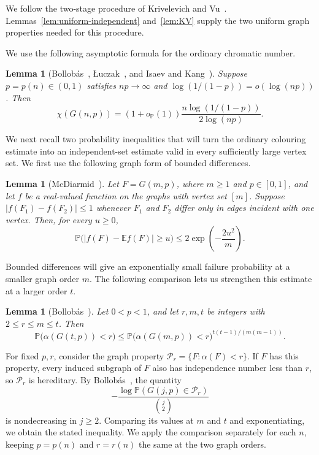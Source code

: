 \documentclass[11pt]{article}
\newtheorem{lemma}[theorem]{Lemma}
\numberwithin{equation}{section}
\newcommand{\Prob}{\mathbb P}
\newcommand{\E}{\mathbb E}
\newcommand{\op}{o_{\mathbb P}}
\begin{document}
We follow the two-stage procedure of Krivelevich and Vu~\cite[proof of Theorem~3]{KV}. Lemmas~\ref{lem:uniform-independent} and~\ref{lem:KV} supply the two uniform graph properties needed for this procedure.

We use the following asymptotic formula for the ordinary chromatic number.


\begin{lemma}[{Bollob\'as~\cite{Bollobas1988},
\L uczak~\cite{Luczak1991}, and
Isaev and Kang~\cite{IK}}]\label{lem:ordinary}
Suppose $p=p(n)\in(0,1)$ satisfies $np\to\infty$ and
$\log(1/(1-p))=o(\log(np))$. Then
\begin{equation}\label{eq:ordinary}
 \chi(G(n,p))=(1+\op(1))
 \frac{n\log(1/(1-p))}{2\log(np)}.
\end{equation}
\end{lemma}
{We next recall two probability inequalities that will turn the ordinary colouring estimate into an independent-set estimate valid in every sufficiently large vertex set. We first use the following graph form of bounded differences.}

  
\begin{lemma}[McDiarmid~{\cite[Lemma~(3.2)]{McDiarmid1989}}]\label{lem:bounded-differences}
Let $F=G(m,p)$, where $m\ge1$ and $p\in[0,1]$, and let $f$ be a real-valued function on the graphs with vertex set $[m]$. Suppose $|f(F_1)-f(F_2)|\le1$ whenever $F_1$ and $F_2$ differ only in edges incident with one vertex. Then, for every $u\ge0$,
\[
 \Prob\bigl(|f(F)-\E f(F)|\ge u\bigr)
 \le2\exp\left(-\frac{2u^2}{m}\right).
\]
\end{lemma}
 

  {Bounded differences will give an exponentially small failure probability at a smaller graph order $m$. The following comparison lets us strengthen this estimate at a larger order $t$.}

  
\begin{lemma}[Bollob\'as~{\cite[Theorem~5]{BollobasICM1998}}]
\label{lem:hereditary-comparison}
Let $0<p<1$, and let $r,m,t$ be integers with $2\le r\le m\le t$. Then
\[
 \Prob\bigl(\alpha(G(t,p))<r\bigr)
 \le
 \Prob\bigl(\alpha(G(m,p))<r\bigr)^{t(t-1)/(m(m-1))}.
\]
\end{lemma}
 

  
For fixed $p,r$, consider the graph property $\mathcal P_r=\{F:\alpha(F)<r\}$. If $F$ has this property, every induced subgraph of $F$ also has independence number less than $r$, so $\mathcal P_r$ is hereditary. By Bollob\'as~\cite[Theorem~5]{BollobasICM1998}, the quantity
\[
 -\frac{\log\Prob(G(j,p)\in\mathcal P_r)}{\binom j2}
\]
is nondecreasing in $j\ge2$. Comparing its values at $m$ and $t$ and exponentiating, we obtain the stated inequality. We apply the comparison separately for each $n$, keeping $p=p(n)$ and $r=r(n)$ the same at the two graph orders.
 
\end{document}

